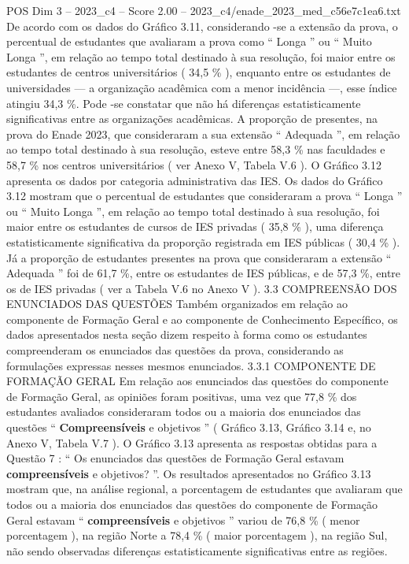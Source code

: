 \begin{textsample}{POS Dim 3 – 2023\_c4 – Score 2.00 – 2023\_c4/enade\_2023\_med\_c56e7c1ea6.txt}
De acordo com os dados do Gráfico 3.11, considerando -se a extensão da prova, o percentual de estudantes que avaliaram a prova como “ Longa ” ou “ Muito Longa ”, em relação ao tempo total destinado à sua resolução, foi maior entre os estudantes de centros universitários ( 34,5 \% ), enquanto entre os estudantes de universidades — a organização acadêmica com a menor incidência —, esse índice atingiu 34,3 \%.
Pode -se constatar que não há diferenças estatisticamente significativas entre as organizações acadêmicas.
A proporção de presentes, na prova do Enade 2023, que consideraram a sua extensão “ Adequada ”, em relação ao tempo total destinado à sua resolução, esteve entre 58,3 \% nas faculdades e 58,7 \% nos centros universitários ( ver Anexo V, Tabela V.6 ).
O Gráfico 3.12 apresenta os dados por categoria administrativa das IES.
Os dados do Gráfico 3.12 mostram que o percentual de estudantes que consideraram a prova “ Longa ” ou “ Muito Longa ”, em relação ao tempo total destinado à sua resolução, foi maior entre os estudantes de cursos de IES privadas ( 35,8 \% ), uma diferença estatisticamente significativa da proporção registrada em IES públicas ( 30,4 \% ).
Já a proporção de estudantes presentes na prova que consideraram a extensão “ Adequada ” foi de 61,7 \%, entre os estudantes de IES públicas, e de 57,3 \%, entre os de IES privadas ( ver a Tabela V.6 no Anexo V ). 3.3 COMPREENSÃO DOS ENUNCIADOS DAS QUESTÕES Também organizados em relação ao componente de Formação Geral e ao componente de Conhecimento Específico, os dados apresentados nesta seção dizem respeito à forma como os estudantes compreenderam os enunciados das questões da prova, considerando as formulações expressas nesses mesmos enunciados. 3.3.1 COMPONENTE DE FORMAÇÃO GERAL Em relação aos enunciados das questões do componente de Formação Geral, as opiniões foram positivas, uma vez que 77,8 \% dos estudantes avaliados consideraram todos ou a maioria dos enunciados das questões “ \textbf{Compreensíveis} e objetivos ” ( Gráfico 3.13, Gráfico 3.14 e, no Anexo V, Tabela V.7 ).
O Gráfico 3.13 apresenta as respostas obtidas para a Questão 7 : “ Os enunciados das questões de Formação Geral estavam \textbf{compreensíveis} e objetivos? ”.
Os resultados apresentados no Gráfico 3.13 mostram que, na análise regional, a porcentagem de estudantes que avaliaram que todos ou a maioria dos enunciados das questões do componente de Formação Geral estavam “ \textbf{compreensíveis} e objetivos ” variou de 76,8 \% ( menor porcentagem ), na região Norte a 78,4 \% ( maior porcentagem ), na região Sul, não sendo observadas diferenças estatisticamente significativas entre as regiões.

\end{textsample}
